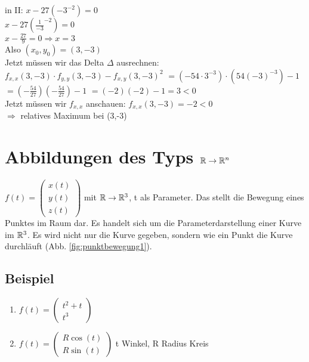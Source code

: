in II: $x-27 (-3^{-2}) = 0$\\
$x-27 (\frac{1}{-3}^{-2}) = 0$\\
$x - \frac{27}{9} = 0 \Rightarrow x=3$\\
Also $(x_0,y_0)=(3,-3)$\\

Jetzt müssen wir das Delta $\Delta$ ausrechnen: 
$ f_{x,x}(3,-3) \cdot f_{y,y}(3,-3) - f_{x,y}(3,-3)^2$
$ = (-54\cdot 3^{-3}) \cdot (54(-3)^{-3}) -1 $
$ = (-\frac{54}{27}) (-\frac{54}{27}) - 1 $
$ = (-2)(-2)-1 = 3 < 0 $\\

Jetzt müssen wir $f_{x,x}$ anschauen: 
$ f_{x,x}(3,-3) = -2 < 0$\\
$\Rightarrow $ relatives Maximum bei (3,-3) 

\section{Abbildungen des Typs $\mathbb{R} \rightarrow \mathbb{R}^n$}
$ f(t) = \left( \begin{array}{c}  x(t)\\  y(t)\\ z(t) \end{array} \right)$ mit $\mathbb{R} \rightarrow \mathbb{R}^3$, t als Parameter. Das stellt die Bewegung eines Punktes im Raum dar. Es handelt sich um die Parameterdarstellung einer Kurve im $\mathbb{R}^3$. Es wird nicht nur die Kurve gegeben, sondern wie ein Punkt die Kurve durchläuft (Abb. \ref{fig:punktbewegung1}). 

\subsection{Beispiel}
\begin{enumerate}
\item $ f(t) = \left( \begin{array}{c} t^2 + t\\ t^3 \end{array} \right)$
\item $ f(t) = \left( \begin{array}{c} R \cos(t)\\ R \sin(t) \end{array} \right) $ t Winkel, R Radius Kreis
\end{enumerate}